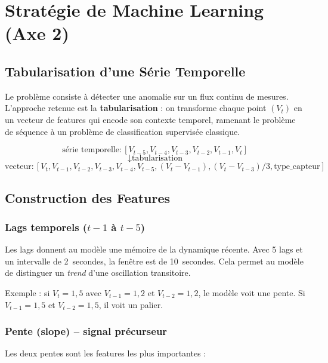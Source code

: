 \documentclass[11pt,a4paper]{article}
\begin{document}
\newpage

\section{Stratégie de Machine Learning (Axe 2)}

\subsection{Tabularisation d'une Série Temporelle}

Le problème consiste à détecter une anomalie sur un flux continu de mesures. L'approche retenue est la \textbf{tabularisation} : on transforme chaque point $(V_t)$ en un vecteur de features qui encode son contexte temporel, ramenant le problème de séquence à un problème de classification supervisée classique.

\[
\text{série temporelle} : [V_{t-5}, V_{t-4}, V_{t-3}, V_{t-2}, V_{t-1}, V_t]
\]
\[
\downarrow \text{tabularisation}
\]
\[
\text{vecteur} : [V_t, V_{t-1}, V_{t-2}, V_{t-3}, V_{t-4}, V_{t-5}, (V_t - V_{t-1}), (V_t - V_{t-3})/3, \text{type\_capteur}]
\]

\subsection{Construction des Features}

\subsubsection{Lags temporels ($t-1$ à $t-5$)}

Les lags donnent au modèle une mémoire de la dynamique récente. Avec 5 lags et un intervalle de 2~secondes, la fenêtre est de 10~secondes. Cela permet au modèle de distinguer un \emph{trend} d'une oscillation transitoire.

Exemple : si $V_t = 1,5$ avec $V_{t-1} = 1,2$ et $V_{t-2} = 1,2$, le modèle voit une pente. Si $V_{t-1}=1,5$ et $V_{t-2}=1,5$, il voit un palier.

\subsubsection{Pente (slope) -- signal précurseur}

Les deux pentes sont les features les plus importantes :
\end{document}
